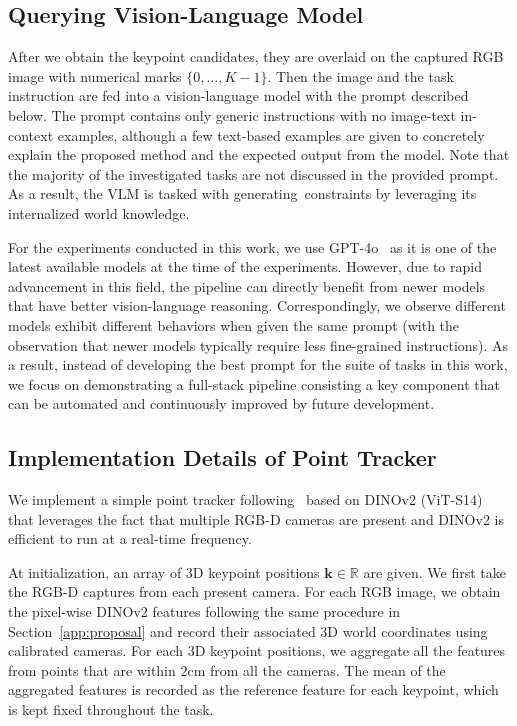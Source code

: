 \subsection{Querying Vision-Language Model}\label{app:prompt}

After we obtain the keypoint candidates, they are overlaid on the captured RGB image with numerical marks $\{0, \ldots, K-1\}$. Then the image and the task instruction are fed into a vision-language model with the prompt described below. The prompt contains only generic instructions with no image-text in-context examples, although a few text-based examples are given to concretely explain the proposed method and the expected output from the model. Note that the majority of the investigated tasks are not discussed in the provided prompt. As a result, the VLM is tasked with generating~\algabrvname constraints by leveraging its internalized world knowledge.

For the experiments conducted in this work, we use GPT-4o~\cite{openai2023gpt} as it is one of the latest available models at the time of the experiments. However, due to rapid advancement in this field, the pipeline can directly benefit from newer models that have better vision-language reasoning.
Correspondingly, we observe different models exhibit different behaviors when given the same prompt (with the observation that newer models typically require less fine-grained instructions).
As a result, instead of developing the best prompt for the suite of tasks in this work, we focus on demonstrating a full-stack pipeline consisting a key component that can be automated and continuously improved by future development.



\subsection{Implementation Details of Point Tracker}\label{app:tracker}
We implement a simple point tracker following~\cite{wang2023d3fields} based on DINOv2 (ViT-S14)~\cite{oquab2023dinov2} that leverages the fact that multiple RGB-D cameras are present and DINOv2 is efficient to run at a real-time frequency.

At initialization, an array of 3D keypoint positions $\bm{k} \in \mathbb{R}$ are given.
We first take the RGB-D captures from each present camera.
For each RGB image, we obtain the pixel-wise DINOv2 features following the same procedure in Section~\ref{app:proposal} and record their associated 3D world coordinates using calibrated cameras.
For each 3D keypoint positions, we aggregate all the features from points that are within $2$cm from all the cameras. The mean of the aggregated features is recorded as the reference feature for each keypoint, which is kept fixed throughout the task.

